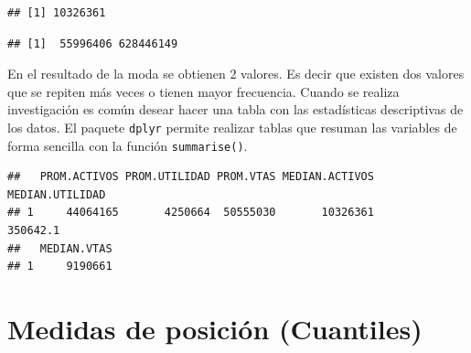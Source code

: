 \documentclass[]{book}
\newenvironment{Shaded}{\begin{snugshade}}{\end{snugshade}}
\newcommand{\KeywordTok}[1]{\textcolor[rgb]{0.13,0.29,0.53}{\textbf{#1}}}
\newcommand{\DataTypeTok}[1]{\textcolor[rgb]{0.13,0.29,0.53}{#1}}
\newcommand{\StringTok}[1]{\textcolor[rgb]{0.31,0.60,0.02}{#1}}
\newcommand{\OperatorTok}[1]{\textcolor[rgb]{0.81,0.36,0.00}{\textbf{#1}}}
\newcommand{\NormalTok}[1]{#1}
\begin{document}
\begin{verbatim}
## [1] 10326361
\end{verbatim}

\begin{Shaded}
\end{Shaded}

\begin{verbatim}
## [1]  55996406 628446149
\end{verbatim}

En el resultado de la moda se obtienen 2 valores. Es decir que existen
dos valores que se repiten más veces o tienen mayor frecuencia. Cuando
se realiza investigación es común desear hacer una tabla con las
estadísticas descriptivas de los datos. El paquete \texttt{dplyr}
permite realizar tablas que resuman las variables de forma sencilla con
la función \texttt{summarise()}.

\begin{Shaded}
\end{Shaded}

\begin{verbatim}
##   PROM.ACTIVOS PROM.UTILIDAD PROM.VTAS MEDIAN.ACTIVOS MEDIAN.UTILIDAD
## 1     44064165       4250664  50555030       10326361        350642.1
##   MEDIAN.VTAS
## 1     9190661
\end{verbatim}

\section{Medidas de posición
(Cuantiles)}\label{medidas-de-posicion-cuantiles}
\end{document}
